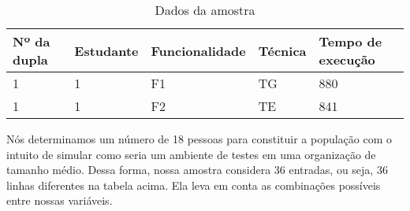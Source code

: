 \begin{table}[h]\footnotesize
    \caption{Dados da amostra}
    \centering
    \begin{tabular}{|l|l|l|l|l|}
    \addlinespace
    \hline
    {\bf Nº da dupla}  & {\bf Estudante} & {\bf Funcionalidade} & {\bf Técnica}
    & {\bf Tempo de execução}\\ \hline 1 & 1 & F1 & TG & 880\\ \hline
    1 & 1 & F2 & TE & 841\\ \hline
    \end{tabular}
  \label{tab:amostra}
\end{table}

Nós determinamos um número de 18 pessoas para constituir a população com o
intuito de simular como seria um ambiente de testes em uma organização de
tamanho médio. Dessa forma, nossa amostra considera 36 entradas, ou seja, 36
linhas diferentes na tabela acima. Ela leva em conta as combinações possíveis
entre nossas variáveis.

